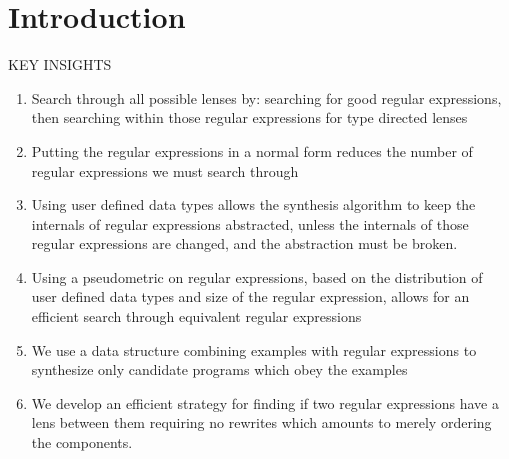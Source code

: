 \section{Introduction}

KEY INSIGHTS
\begin{enumerate}
\item Search through all possible lenses by: searching for good regular
expressions, then searching within those regular expressions for type directed
lenses
\item Putting the regular expressions in a normal form reduces the number of
regular expressions we must search through
\item Using user defined data types allows the synthesis algorithm to keep the
internals of regular expressions abstracted, unless the internals of those
regular expressions are changed, and the abstraction must be broken.
\item Using a pseudometric on regular expressions, based on the
distribution of user defined data types and size of the regular expression,
allows for an efficient search through equivalent regular expressions
\item We use a data structure combining examples with regular expressions to
synthesize only candidate programs which obey the examples
\item We develop an efficient strategy for finding if two
regular expressions have a lens between them requiring no rewrites which amounts
to merely ordering the components.
\end{enumerate}

